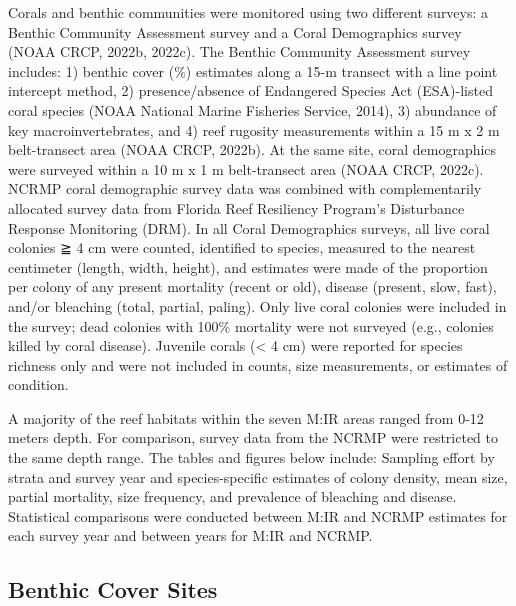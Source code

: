 \documentclass[
]{article}
\begin{document}
Corals and benthic communities were monitored using two different
surveys: a Benthic Community Assessment survey and a Coral Demographics
survey (NOAA CRCP, 2022b, 2022c). The Benthic Community Assessment
survey includes: 1) benthic cover (\%) estimates along a 15-m transect
with a line point intercept method, 2) presence/absence of Endangered
Species Act (ESA)-listed coral species (NOAA National Marine Fisheries
Service, 2014), 3) abundance of key macroinvertebrates, and 4) reef
rugosity measurements within a 15 m x 2 m belt-transect area (NOAA CRCP,
2022b). At the same site, coral demographics were surveyed within a 10 m
x 1 m belt-transect area (NOAA CRCP, 2022c). NCRMP coral demographic
survey data was combined with complementarily allocated survey data from
Florida Reef Resiliency Program's Disturbance Response Monitoring (DRM).
In all Coral Demographics surveys, all live coral colonies ≧ 4 cm were
counted, identified to species, measured to the nearest centimeter
(length, width, height), and estimates were made of the proportion per
colony of any present mortality (recent or old), disease (present, slow,
fast), and/or bleaching (total, partial, paling). Only live coral
colonies were included in the survey; dead colonies with 100\% mortality
were not surveyed (e.g., colonies killed by coral disease). Juvenile
corals (\textless{} 4 cm) were reported for species richness only and
were not included in counts, size measurements, or estimates of
condition.

A majority of the reef habitats within the seven M:IR areas ranged from
0-12 meters depth. For comparison, survey data from the NCRMP were
restricted to the same depth range. The tables and figures below
include: Sampling effort by strata and survey year and species-specific
estimates of colony density, mean size, partial mortality, size
frequency, and prevalence of bleaching and disease. Statistical
comparisons were conducted between M:IR and NCRMP estimates for each
survey year and between years for M:IR and NCRMP.

\hypertarget{benthic-cover-sites}{%
\subsection{Benthic Cover Sites}\label{benthic-cover-sites}}
\end{document}
